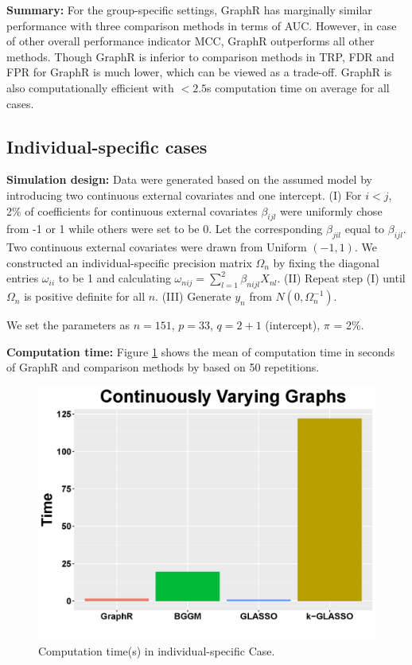 \documentclass[
]{book}
\begin{document}
\textbf{Summary:} For the group-specific settings, GraphR has marginally similar performance with three comparison methods in terms of AUC. However, in case of other overall performance indicator MCC, GraphR outperforms all other methods. Though GraphR is inferior to comparison methods in TRP, FDR and FPR for GraphR is much lower, which can be viewed as a trade-off. GraphR is also computationally efficient with \(<2.5\)s computation time on average for all cases.

\hypertarget{simcont}{%
\subsection{Individual-specific cases}\label{simcont}}

\textbf{Simulation design:}
Data were generated based on the assumed model by introducing two continuous external covariates and one intercept. (I) For \(i < j\), 2\% of coefficients for continuous external covariates \(\beta_{ijl}\) were uniformly chose from -1 or 1 while others were set to be 0. Let the corresponding \(\beta_{jil}\) equal to \(\beta_{ijl}\). Two continuous external covariates were drawn from Uniform \((-1,1)\). We constructed an individual-specific precision matrix \(\Omega_n\) by fixing the diagonal entries \(\omega_{ii}\) to be 1 and calculating \(\omega_{nij} = \sum_{l=1}^2\beta_{nijl}X_{nl}\). (II) Repeat step (I) until \(\Omega_n\) is positive definite for all \(n\). (III) Generate \(y_n\) from \(N(0, \Omega_n^{-1})\).

We set the parameters as \(n = 151\), \(p = 33\), \(q = 2 + 1\) (intercept), \(\pi\) = 2\%.

\textbf{Computation time: }
Figure \ref{fig:conttime} shows the mean of computation time in seconds of GraphR and comparison methods by based on 50 repetitions.

\begin{figure}

{\centering \includegraphics[width=0.5\linewidth]{images/cont_time} 

}

\caption{Computation time(s) in  individual-specific Case.}\label{fig:conttime}
\end{figure}
\end{document}
